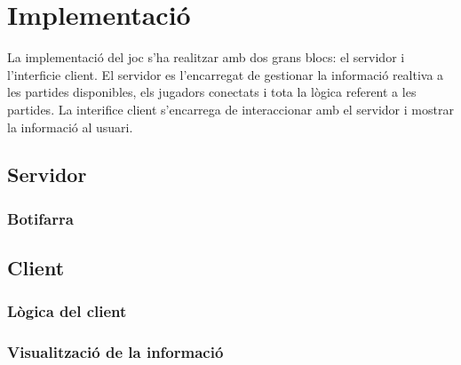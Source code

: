 \chapter{Implementació}

La implementació del joc s'ha realitzar amb dos grans blocs: el servidor i l'interficie client. El servidor es l'encarregat de gestionar la informació realtiva a les partides disponibles, els jugadors conectats i tota la lògica referent a les partides. La interifice client s'encarrega de interaccionar amb el servidor i mostrar la informació al usuari. 

\section{Servidor}

\subsection{Botifarra}

\section{Client}

\subsection{Lògica del client}

\subsection{Visualització de la informació}
